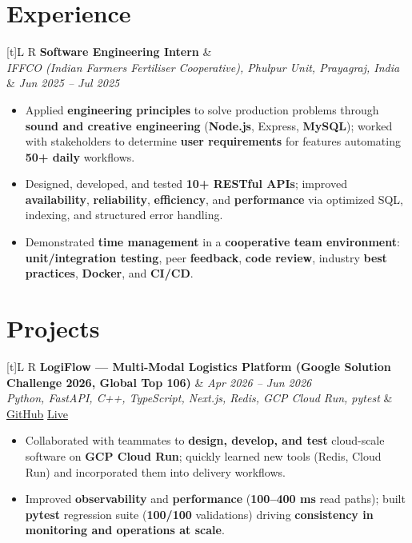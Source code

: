 \documentclass[a4paper,10pt]{article}
\newcommand{\resumeSubheading}[4]{%
  \vspace{0.5mm}
  \noindent
  \begin{tabularx}{\textwidth}[t]{L R}
    \textbf{#1} & #4 \\
    \textit{#3} & \textit{#2} \\
  \end{tabularx}
  \vspace{-0.5mm}%
}
\newcommand{\resumeProject}[4]{%
  \vspace{0.5mm}
  \noindent
  \begin{tabularx}{\textwidth}[t]{L R}
    \textbf{#1} & \textit{#3} \\
    \textit{#2} & #4 \\
  \end{tabularx}
  \vspace{-0.5mm}%
}
\begin{document}
\section{Experience}
\small
\resumeSubheading
  {Software Engineering Intern}{Jun 2025 -- Jul 2025}
  {IFFCO (Indian Farmers Fertiliser Cooperative), Phulpur Unit, Prayagraj, India}{}
\begin{itemize}
  \item Applied \textbf{engineering principles} to solve production problems through \textbf{sound and creative engineering} (\textbf{Node.js}, Express, \textbf{MySQL}); worked with stakeholders to determine \textbf{user requirements} for features automating \textbf{50+ daily} workflows.
  \item Designed, developed, and tested \textbf{10+ RESTful APIs}; improved \textbf{availability}, \textbf{reliability}, \textbf{efficiency}, and \textbf{performance} via optimized SQL, indexing, and structured error handling.
  \item Demonstrated \textbf{time management} in a \textbf{cooperative team environment}: \textbf{unit/integration testing}, peer \textbf{feedback}, \textbf{code review}, industry \textbf{best practices}, \textbf{Docker}, and \textbf{CI/CD}.
\end{itemize}

\section{Projects}
\small

\resumeProject
  {LogiFlow --- Multi-Modal Logistics Platform (Google Solution Challenge 2026, Global Top 106)}
  {Python, FastAPI, C++, TypeScript, Next.js, Redis, GCP Cloud Run, pytest}
  {Apr 2026 -- Jun 2026}
  {\href{https://github.com/Ojas-Srivastava05/LogiFlow-Solution-Challenge-2026}{GitHub} \textbar{} \href{https://logi-flow-solution-challenge-2026.vercel.app/}{Live}}
\begin{itemize}
  \item Collaborated with teammates to \textbf{design, develop, and test} cloud-scale software on \textbf{GCP Cloud Run}; quickly learned new tools (Redis, Cloud Run) and incorporated them into delivery workflows.
  \item Improved \textbf{observability} and \textbf{performance} (\textbf{100--400 ms} read paths); built \textbf{pytest} regression suite (\textbf{100/100} validations) driving \textbf{consistency in monitoring and operations at scale}.
\end{itemize}
\end{document}
